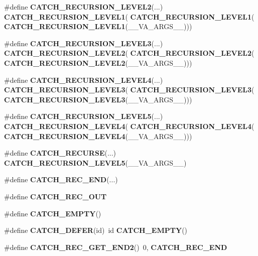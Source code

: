 \begin{DoxyCompactItemize}
\item 
\#define \textbf{ C\+A\+T\+C\+H\+\_\+\+R\+E\+C\+U\+R\+S\+I\+O\+N\+\_\+\+L\+E\+V\+E\+L2}(...)~\textbf{ C\+A\+T\+C\+H\+\_\+\+R\+E\+C\+U\+R\+S\+I\+O\+N\+\_\+\+L\+E\+V\+E\+L1}(\textbf{ C\+A\+T\+C\+H\+\_\+\+R\+E\+C\+U\+R\+S\+I\+O\+N\+\_\+\+L\+E\+V\+E\+L1}(\textbf{ C\+A\+T\+C\+H\+\_\+\+R\+E\+C\+U\+R\+S\+I\+O\+N\+\_\+\+L\+E\+V\+E\+L1}(\+\_\+\+\_\+\+V\+A\+\_\+\+A\+R\+G\+S\+\_\+\+\_\+)))
\item 
\#define \textbf{ C\+A\+T\+C\+H\+\_\+\+R\+E\+C\+U\+R\+S\+I\+O\+N\+\_\+\+L\+E\+V\+E\+L3}(...)~\textbf{ C\+A\+T\+C\+H\+\_\+\+R\+E\+C\+U\+R\+S\+I\+O\+N\+\_\+\+L\+E\+V\+E\+L2}(\textbf{ C\+A\+T\+C\+H\+\_\+\+R\+E\+C\+U\+R\+S\+I\+O\+N\+\_\+\+L\+E\+V\+E\+L2}(\textbf{ C\+A\+T\+C\+H\+\_\+\+R\+E\+C\+U\+R\+S\+I\+O\+N\+\_\+\+L\+E\+V\+E\+L2}(\+\_\+\+\_\+\+V\+A\+\_\+\+A\+R\+G\+S\+\_\+\+\_\+)))
\item 
\#define \textbf{ C\+A\+T\+C\+H\+\_\+\+R\+E\+C\+U\+R\+S\+I\+O\+N\+\_\+\+L\+E\+V\+E\+L4}(...)~\textbf{ C\+A\+T\+C\+H\+\_\+\+R\+E\+C\+U\+R\+S\+I\+O\+N\+\_\+\+L\+E\+V\+E\+L3}(\textbf{ C\+A\+T\+C\+H\+\_\+\+R\+E\+C\+U\+R\+S\+I\+O\+N\+\_\+\+L\+E\+V\+E\+L3}(\textbf{ C\+A\+T\+C\+H\+\_\+\+R\+E\+C\+U\+R\+S\+I\+O\+N\+\_\+\+L\+E\+V\+E\+L3}(\+\_\+\+\_\+\+V\+A\+\_\+\+A\+R\+G\+S\+\_\+\+\_\+)))
\item 
\#define \textbf{ C\+A\+T\+C\+H\+\_\+\+R\+E\+C\+U\+R\+S\+I\+O\+N\+\_\+\+L\+E\+V\+E\+L5}(...)~\textbf{ C\+A\+T\+C\+H\+\_\+\+R\+E\+C\+U\+R\+S\+I\+O\+N\+\_\+\+L\+E\+V\+E\+L4}(\textbf{ C\+A\+T\+C\+H\+\_\+\+R\+E\+C\+U\+R\+S\+I\+O\+N\+\_\+\+L\+E\+V\+E\+L4}(\textbf{ C\+A\+T\+C\+H\+\_\+\+R\+E\+C\+U\+R\+S\+I\+O\+N\+\_\+\+L\+E\+V\+E\+L4}(\+\_\+\+\_\+\+V\+A\+\_\+\+A\+R\+G\+S\+\_\+\+\_\+)))
\item 
\#define \textbf{ C\+A\+T\+C\+H\+\_\+\+R\+E\+C\+U\+R\+SE}(...)~\textbf{ C\+A\+T\+C\+H\+\_\+\+R\+E\+C\+U\+R\+S\+I\+O\+N\+\_\+\+L\+E\+V\+E\+L5}(\+\_\+\+\_\+\+V\+A\+\_\+\+A\+R\+G\+S\+\_\+\+\_\+)
\item 
\#define \textbf{ C\+A\+T\+C\+H\+\_\+\+R\+E\+C\+\_\+\+E\+ND}(...)
\item 
\#define \textbf{ C\+A\+T\+C\+H\+\_\+\+R\+E\+C\+\_\+\+O\+UT}
\item 
\#define \textbf{ C\+A\+T\+C\+H\+\_\+\+E\+M\+P\+TY}()
\item 
\#define \textbf{ C\+A\+T\+C\+H\+\_\+\+D\+E\+F\+ER}(id)~id \textbf{ C\+A\+T\+C\+H\+\_\+\+E\+M\+P\+TY}()
\item 
\#define \textbf{ C\+A\+T\+C\+H\+\_\+\+R\+E\+C\+\_\+\+G\+E\+T\+\_\+\+E\+N\+D2}()~0, \textbf{ C\+A\+T\+C\+H\+\_\+\+R\+E\+C\+\_\+\+E\+ND}

\end{DoxyCompactItemize}
